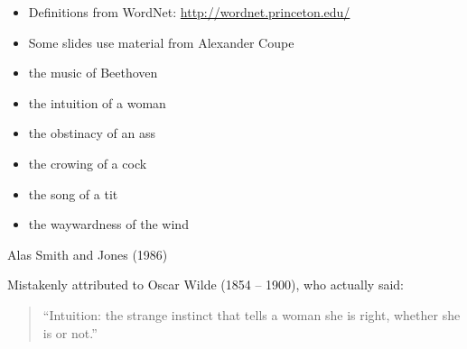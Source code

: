 \documentclass[headrule,footrule]{foils}
\begin{document}






\MyLogo{}

\begin{itemize}\addtolength{\itemsep}{1ex}
\item Definitions from WordNet: \url{http://wordnet.princeton.edu/}

\item Some slides use material from Alexander Coupe

  
 \end{itemize}


\begin{itemize} %
\item the music of Beethoven
\item the intuition of a woman
\item the obstinacy of an ass
\item the crowing of a cock
\item the song of a tit
\item the waywardness of the wind
\end{itemize}
\begin{flushright}
  Alas Smith and Jones (1986)
\end{flushright}
Mistakenly attributed to Oscar Wilde (1854 – 1900), who actually said:
\begin{quote}
``Intuition: the strange instinct that tells a woman she is right, whether she is or not.''  
\end{quote}
\end{document}
